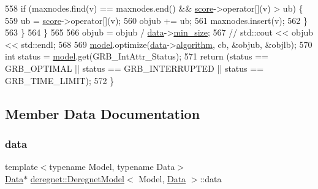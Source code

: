 \begin{DoxyCode}
558             \textcolor{keywordflow}{if} (maxnodes.find(v) == maxnodes.end() && \hyperlink{classderegnet_1_1DeregnetModel_a46224b0bda5bab796d3b7cb41c184a4d}{score}->operator[](v) > ub) \{
559                 ub = \hyperlink{classderegnet_1_1DeregnetModel_a46224b0bda5bab796d3b7cb41c184a4d}{score}->operator[](v);
560                 objub += ub;
561                 maxnodes.insert(v);
562             \}
563         \}
564     \}
565 
566     objub = objub / \hyperlink{classderegnet_1_1DeregnetModel_ad5399761cf6293a702f3800bda4806d1}{data}->\hyperlink{classderegnet_1_1AvgdrgntData_a733e0cd627433fca043a7f9b70af18c3}{min\_size};
567     \textcolor{comment}{// std::cout << objub << std::endl;}
568 
569     \hyperlink{classderegnet_1_1DeregnetModel_a30d525de2086e342b33fe3e45ede4947}{model}.optimize(\hyperlink{classderegnet_1_1DeregnetModel_ad5399761cf6293a702f3800bda4806d1}{data}->\hyperlink{classderegnet_1_1AvgdrgntData_aa75d6acc2d63aa589651c705eaf89280}{algorithm}, cb, &objub, &objlb);
570     \textcolor{keywordtype}{int} status = \hyperlink{classderegnet_1_1DeregnetModel_a30d525de2086e342b33fe3e45ede4947}{model}.get(GRB\_IntAttr\_Status);
571     \textcolor{keywordflow}{return} (status == GRB\_OPTIMAL || status == GRB\_INTERRUPTED || status == GRB\_TIME\_LIMIT);
572 \}
\end{DoxyCode}


\subsection{Member Data Documentation}
\mbox{\label{classderegnet_1_1DeregnetModel_ad5399761cf6293a702f3800bda4806d1}} 
\subsubsection{\texorpdfstring{data}{data}}
{\footnotesize\ttfamily template$<$typename Model, typename Data$>$ \\
\hyperlink{avgdrgnt_8cpp_a1d1235306db276e9b36acba1db1509e8}{Data}$\ast$ \hyperlink{classderegnet_1_1DeregnetModel}{deregnet\+::\+Deregnet\+Model}$<$ Model, \hyperlink{avgdrgnt_8cpp_a1d1235306db276e9b36acba1db1509e8}{Data} $>$\+::data\hspace{0.3cm}{\ttfamily [protected]}}



